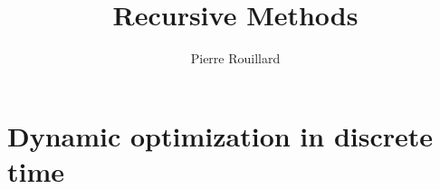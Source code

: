 \documentclass[letterpaper,12pt,leqno]{article}
\begin{document}
\title{Recursive Methods}
\author{Pierre Rouillard}
\date{}

\begin{titlepage}
\maketitle
\tableofcontents
\end{titlepage}

\section{Dynamic optimization in discrete time}\label{sec:lec1}

\end{document}
